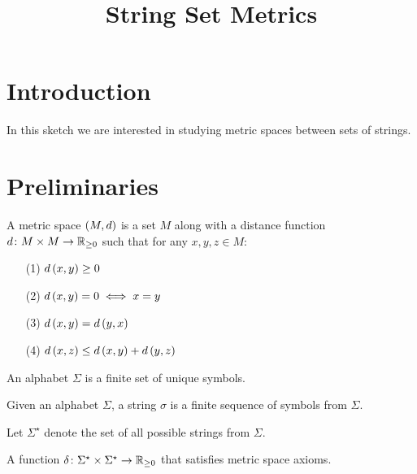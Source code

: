 \documentclass[12pt]{article}
\title{String Set Metrics}
\date{}
\begin{document}
\maketitle

\section{Introduction}
In this sketch we are interested in studying metric spaces between
sets of strings.

\section{Preliminaries}

\begin{definition}
  A metric space \(\left(M, d\right)\) is a set \(M\) along with a distance
  function \(d \colon M \times M \to \mathbb{R}_{\geq 0}\) such that
  for any \(x, y, z \in M\):
  \begin{enumerate}
    \item[(1)]
      \(d \left(x, y\right) \geq 0\)

    \item[(2)]
      \(d\left(x, y\right) = 0 \iff x = y\)

    \item[(3)]
      \(d\left(x, y\right) = d\left(y, x\right)\)

    \item[(4)]
      \(d\left(x, z\right) \leq d\left(x, y\right) + d\left(y, z\right)\)
  \end{enumerate}
\end{definition}

\begin{definition}[Alphabet]
  An alphabet \(\Sigma\) is a finite set of unique symbols.
\end{definition}

\begin{definition}[String]
  Given an alphabet \(\Sigma\),
  a string \(\sigma\) is a finite sequence of symbols from \(\Sigma\).
\end{definition}

\begin{definition}
  Let \(\Sigma^\star\) denote the set of all possible strings from \(\Sigma\).
\end{definition}

\begin{definition}
  A function \(\delta \colon \Sigma^\star \times \Sigma^\star \to \mathbb{R}_{\geq 0}\)
  that satisfies metric space axioms.
\end{definition}
\end{document}
